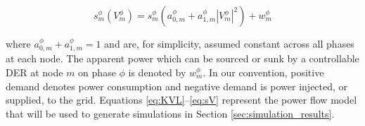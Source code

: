 \begin{equation}
	s_{m}^{\phi} ( V_{m}^{\phi} ) = s_{m}^{\phi} \left(a_{0,m}^{\phi} + a_{1,m}^{\phi} | V_{m}^{\phi} |^2 \right) + w_{m}^{\phi}
    \label{eq:sV}
\end{equation}

\noindent where $a_{0,m}^{\phi} + a_{1,m}^{\phi} = 1$ and are, for simplicity, assumed constant across all phases at each node.  The apparent power which can be sourced or sunk by a controllable DER at node $m$ on phase $\phi$ is denoted by $w_{m}^{\phi}$. In our convention, positive demand denotes power consumption and negative demand is power injected, or supplied, to the grid.  Equations \eqref{eq:KVL}--\eqref{eq:sV} represent the power flow model that will be used to generate simulations in Section \ref{sec:simulation_results}.  






